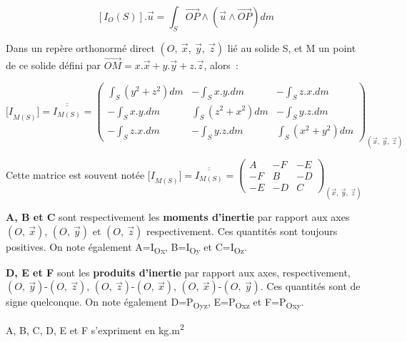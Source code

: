 \[\left\lbrack I_{O}(S) \right\rbrack.\overrightarrow{u} = \int_{S}^{}{\overrightarrow{OP} \land (\overrightarrow{u} \land \overrightarrow{OP})dm}\]

Dans un repère orthonormé direct \(\left( O,\ \overrightarrow{x},\ \overrightarrow{y},\ \overrightarrow{z} \right)\) lié au solide S, et M un point de ce solide défini par \(\overrightarrow{OM} = x.\overrightarrow{x} + y.\overrightarrow{y} + z.\overrightarrow{z}\), alors~:

\[{\lbrack I}_{M(S)}\rbrack = \overline{\overline{I_{M(S)}}} = \begin{pmatrix}
\int_{S}^{}{\left( y^{2} + z^{2} \right)dm} & - \int_{S}^{}{x.y.dm} & - \int_{S}^{}{z.x.dm} \\
 - \int_{S}^{}{x.y.dm} & \int_{S}^{}{\left( z^{2} + x^{2} \right)dm} & - \int_{S}^{}{y.z.dm} \\
 - \int_{S}^{}{z.x.dm} & - \int_{S}^{}{y.z.dm} & \int_{S}^{}{\left( x^{2} + y^{2} \right)dm}
\end{pmatrix}_{\left( \overrightarrow{x},\ \overrightarrow{y},\ \overrightarrow{z} \right)}\]

Cette matrice est souvent notée \({\lbrack I}_{M(S)}\rbrack = \overline{\overline{I_{M(S)}}} = \begin{pmatrix} A & - F & - E \\  - F & B & - D \\  - E & - D & C \end{pmatrix}_{\left( \overrightarrow{x},\ \overrightarrow{y},\ \overrightarrow{z} \right)}\)

\textbf{A, B et C} sont respectivement les \textbf{moments d'inertie} par rapport aux axes \(\left( O,\ \overrightarrow{x} \right)\), \(\left( O,\ \overrightarrow{y} \right)\) et \(\left( O,\ \overrightarrow{z} \right)\) respectivement. Ces quantités sont toujours positives. On note également A=I\textsubscript{Ox}, B=I\textsubscript{Oy} et C=I\textsubscript{Oz}.

\textbf{D, E et F} sont les \textbf{produits d'inertie} par rapport aux axes, respectivement, \(\left( O,\ \overrightarrow{y} \right)\)-\(\left( O,\ \overrightarrow{z} \right)\), \(\left( O,\ \overrightarrow{z} \right)\)-\(\left( O,\ \overrightarrow{x} \right)\), \(\left( O,\ \overrightarrow{x} \right)\)-\(\left( O,\ \overrightarrow{y} \right)\). Ces quantités sont de signe quelconque. On note également D=P\textsubscript{Oyz}, E=P\textsubscript{Oxz} et F=P\textsubscript{Oxy}.

A, B, C, D, E et F s'expriment en kg.m\textsuperscript{2}

